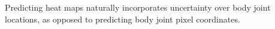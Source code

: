 \documentclass[10pt,twocolumn,letterpaper]{article}
\begin{document}
Predicting heat maps naturally incorporates uncertainty over  body joint locations, as opposed to predicting body joint pixel coordinates. 
 
\end{document}
